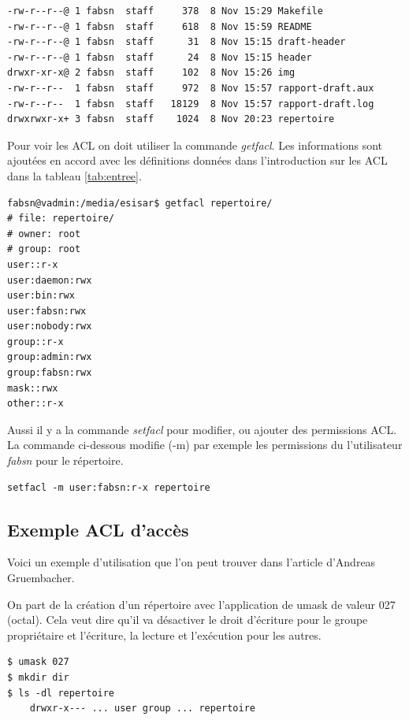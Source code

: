 \begin{center}
\label{verb:ls}
\begin{verbatim}
-rw-r--r--@ 1 fabsn  staff     378  8 Nov 15:29 Makefile
-rw-r--r--@ 1 fabsn  staff     618  8 Nov 15:59 README
-rw-r--r--@ 1 fabsn  staff      31  8 Nov 15:15 draft-header
-rw-r--r--@ 1 fabsn  staff      24  8 Nov 15:15 header
drwxr-xr-x@ 2 fabsn  staff     102  8 Nov 15:26 img
-rw-r--r--  1 fabsn  staff     972  8 Nov 15:57 rapport-draft.aux
-rw-r--r--  1 fabsn  staff   18129  8 Nov 15:57 rapport-draft.log
drwxrwxr-x+ 3 fabsn  staff	  1024  8 Nov 20:23 repertoire
\end{verbatim}
\end{center}

Pour voir les ACL on doit utiliser la commande \emph{getfacl}. Les informations sont ajoutées en accord avec les définitions données dans l'introduction sur les ACL dans la tableau \ref{tab:entree}. 

\begin{verbatim}
fabsn@vadmin:/media/esisar$ getfacl repertoire/
# file: repertoire/
# owner: root
# group: root
user::r-x
user:daemon:rwx
user:bin:rwx
user:fabsn:rwx
user:nobody:rwx
group::r-x
group:admin:rwx
group:fabsn:rwx
mask::rwx
other::r-x	
\end{verbatim}

Aussi il y a la commande \emph{setfacl} pour modifier, ou ajouter des permissions ACL. La commande ci-dessous modifie (-m) par exemple les permissions du l'utilisateur \emph{fabsn} pour le répertoire. 

\begin{verbatim}
setfacl -m user:fabsn:r-x repertoire
\end{verbatim}

\subsection*{Exemple ACL d'accès}

Voici un exemple d'utilisation que l'on peut trouver dans l'article d'Andreas Gruembacher\cite{aclsuse}.

On part de la création d'un répertoire avec l'application de umask de valeur 027 (octal). Cela veut dire qu'il va désactiver le droit d'écriture pour le groupe propriétaire et l'écriture, la lecture et l'exécution pour les autres.

\begin{verbatim}
$ umask 027 
$ mkdir dir 
$ ls -dl repertoire
	drwxr-x--- ... user group ... repertoire
\end{verbatim}

